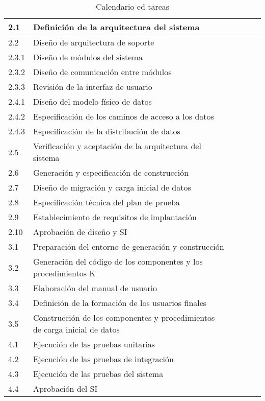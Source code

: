 \documentclass[11pt,a4paper,spanish,twoside]{report}
\begin{document}
{\begin{table}[!h]
\begin{tabular}{|p{0.8cm}||p{5cm}||p{1.5cm}|p{1.5cm}|p{1.5cm}|p{1.5cm}|}
      2.1 & Definición de la arquitectura del sistema &  &  &  &  \\
      \hline
      2.2 & Diseño de arquitectura de soporte &  &  &  &  \\
      \hline
      2.3.1 & Diseño de módulos del sistema  &  &  &  &  \\
      \hline
      2.3.2 & Diseño de comunicación entre módulos  &  &  &  &  \\
      \hline
      2.3.3 & Revisión de la interfaz de usuario  &  &  &  &  \\
      \hline
      2.4.1 & Diseño del modelo físico de datos  &  &  &  &  \\
      \hline
      2.4.2 & Especificación de los caminos de acceso a los datos &  &  &  &  \\
      \hline
      2.4.3 & Especificación de la distribución de datos  &  &  &  &  \\
      \hline
      2.5 & Verificación y aceptación de la arquitectura del sistema  &  &  &  &  \\
      \hline
      2.6 & Generación y especificación de construcción &  &  &  &  \\
      \hline
      2.7 & Diseño de migración y carga inicial de datos &  &  &  &  \\
      \hline
      2.8 & Especificación técnica del plan de prueba &  &  &  &  \\
      \hline
      2.9 & Establecimiento de requisitos de implantación &  &  &  &  \\
      \hline
      2.10 & Aprobación de diseño y SI &  &  &  &  \\
      \hline \hline

      3.1 & Preparación del entorno de generación y construcción & & & &\\
      \hline
      3.2 & Generación del código de los componentes y los procedimientos K & & & &\\
      \hline
      3.3 & Elaboración del manual de usuario & & & &\\
      \hline
      3.4 & Definición de la formación de los usuarios finales & & & &\\
      \hline
      3.5 & Construcción de los componentes y procedimientos de carga inicial
      de datos &  &  &  & \\
      \hline \hline

      4.1 & Ejecución de las pruebas unitarias &  &  &  &\\
      \hline
      4.2 & Ejecución de las pruebas de integración &  &  &  & \\
      \hline
      4.3 & Ejecución de las pruebas del sistema &  &  &  &\\
      \hline
      4.4 & Aprobación del SI &  &  &  &\\
      \end{tabular}
      \caption{Calendario ed tareas} \label{Tab:cal}
\end{table}

}
\end{document}
